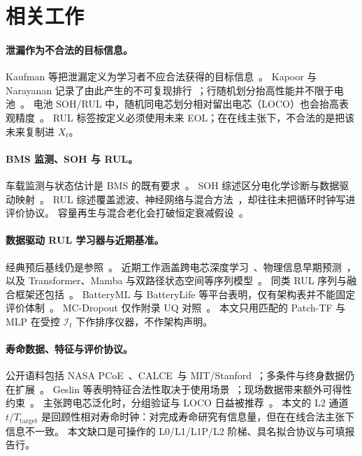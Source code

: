 \documentclass[UTF8,a4paper,12pt]{ctexart}
\begin{document}
\section{相关工作}
\label{sec:related}

\paragraph{泄漏作为不合法的目标信息。}
Kaufman 等把泄漏定义为学习者不应合法获得的目标信息~\cite{kaufman2012leakage}。
Kapoor 与 Narayanan 记录了由此产生的不可复现排行~\cite{kapoor2023leakage}；行随机划分抬高性能并不限于电池~\cite{rosenblatt2024}。
电池 SOH/RUL 中，随机同电芯划分相对留出电芯（LOCO）也会抬高表观精度~\cite{barua2026predictor,ali2026loco}。
RUL 标签按定义必须使用未来 EOL；在在线主张下，不合法的是把该未来复制进 $X_t$。

\paragraph{BMS 监测、SOH 与 RUL。}
车载监测与状态估计是 BMS 的既有要求~\cite{hu2019rser}。
SOH 综述区分电化学诊断与数据驱动映射~\cite{xiong2018soh}。
RUL 综述覆盖滤波、神经网络与混合方法~\cite{lipu2018,wang2024gce,xu2025meas,yang2025batteries}，却往往未把循环时钟写进评价协议。
容量再生与混合老化会打破恒定衰减假设~\cite{birkl2017,aliakbari2025fusedr,fan2026meas}。

\paragraph{数据驱动 RUL 学习器与近期基准。}
经典预后基线仍是参照~\cite{saha2009compare}。
近期工作涵盖跨电芯深度学习~\cite{zhang2025batlinet}、物理信息早期预测~\cite{deng2025piml,oyewole2025uq}，以及 Transformer、Mamba 与双路径状态空间等序列模型~\cite{vaswani2017,nie2023patchtst,huang2025rulmamba,li2026dpmamba,sun2026sgdits}。
同类 RUL 序列与融合框架还包括~\cite{yi2025jps,tian2025energy,ge2025koopman,li2025adapt,wang2025jes}。
BatteryML 与 BatteryLife 等平台表明，仅有架构表并不能固定评价体制~\cite{zhang2024batteryml,tan2025batterylife,li2024lifetime}。
MC-Dropout 仅作附录 UQ 对照~\cite{gal2016}。
本文只用匹配的 Patch-TF 与 MLP 在受控 $\mathcal{I}_t$ 下作排序仪器，不作架构声明。

\paragraph{寿命数据、特征与评价协议。}
公开语料包括 NASA PCoE~\cite{saha2007nasa,saha2009compare}、CALCE~\cite{he2011calce}与 MIT/Stanford~\cite{severson2019nature}；多条件与终身数据仍在扩展~\cite{li2024lifetime,tan2025batterylife,zhang2025batlinet}。
Geslin 等表明特征合法性取决于使用场景~\cite{geslin2023joule}；现场数据带来额外可得性约束~\cite{sulzer2021joule}。
主张跨电芯泛化时，分组验证与 LOCO 日益被推荐~\cite{roman2021,madani2025groupkfold,ali2026loco,barua2026predictor}。
本文的 L2 通道 $t/T_{\mathrm{target}}$ 是回顾性相对寿命时钟：对完成寿命研究有信息量，但在在线合法主张下信息不一致。
本文缺口是可操作的 L0/L1/L1P/L2 阶梯、具名拟合协议与可填报告行。
\end{document}
